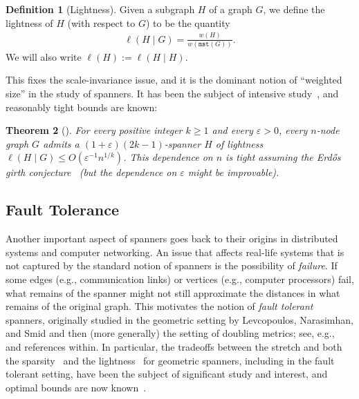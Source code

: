 \documentclass{article}
\theoremstyle{plain}
\newtheorem{theorem}{Theorem}
\theoremstyle{definition}
\newtheorem{definition}[theorem]{Definition}
\newcommand{\eps}{\varepsilon}
\newcommand{\mst}{\texttt{mst}}
\begin{document}
\begin{definition} [Lightness]
Given a subgraph $H$ of a graph $G$, we define the lightness of $H$ (with respect to $G$) to be the quantity
\begin{align*}
    \ell(H \mid G) = \frac{w(H)}{w(\mst(G))}.
\end{align*}
We will also write $\ell(H) := \ell(H \mid H)$.
\end{definition}

This fixes the scale-invariance issue, and it is the dominant notion of ``weighted size'' in the study of spanners. 
It has been the subject of intensive study~\cite{ADDJS93, CDNS92, ENS14, CW16, LS23, BF25, Bodwin25}, and reasonably tight bounds are known:
\begin{theorem} [\cite{LS23, Bodwin25}] \label{thm:introlightness}
For every positive integer $k \geq 1$ and every $\eps > 0$, every $n$-node graph $G$ admits a $(1+\eps)(2k-1)$-spanner $H$ of lightness $\ell(H \mid G) \leq O(\eps^{-1} n^{1/k})$.
This dependence on $n$ is tight assuming the Erd\H{o}s girth conjecture~\cite{girth} (but the dependence on $\eps$ might be improvable).
\end{theorem}


\subsection{Fault Tolerance}

Another important aspect of spanners goes back to their origins in distributed systems and computer networking.  An issue that affects real-life systems that is not captured by the standard notion of spanners is the possibility of \emph{failure}.
If some edges (e.g., communication links) or vertices (e.g., computer processors) fail, what remains of the spanner might not still approximate the distances in what remains of the original graph.
This motivates the notion of \emph{fault tolerant} spanners, originally studied in the geometric setting by Levcopoulos, Narasimhan, and Smid \cite{LNS98} and then (more generally) the setting of doubling metrics; see, e.g.,~\cite{LNS98,Lukovszki99,CZ04,NS07,BHO20,Solomon14,BDMS13,CLN15,CLNS15,LST23} and references within.
In particular, the tradeoffs between the stretch and both the sparsity~\cite{LNS98,Lukovszki99,CZ04,CLN15,CLNS15,LST23} and the lightness~\cite{CZ04,Solomon14,CLNS15,LST23} for geometric spanners, including in the fault tolerant setting, have been the subject of significant study and interest, and optimal bounds are now known~\cite{CZ04,LST23}.  
\end{document}
